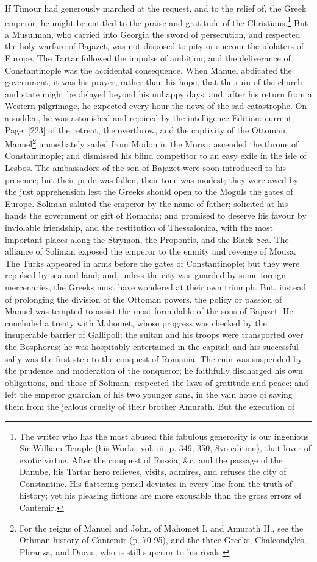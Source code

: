If Timour had generously marched at the request, and to the relief of, the Greek emperor, he might be entitled to the praise and gratitude of the Christians.\footnote{The writer who has the most abused this fabulous generosity is our ingenious Sir William Temple (his Works, vol. iii. p. 349, 350, 8vo edition), that lover of exotic virtue. After the conquest of Russia, \&c. and the passage of the Danube, his Tartar hero relieves, visits, admires, and refuses the city of Constantine. His flattering pencil deviates in every line from the truth of history; yet his pleasing fictions are more excusable than the gross errors of Cantemir.} But a Musulman, who carried into Georgia the sword of persecution, and respected the holy warfare of Bajazet, was not disposed to pity or succour the idolaters of Europe. The Tartar followed the impulse of ambition; and the deliverance of Constantinople was the accidental consequence. When Manuel abdicated the government, it was his prayer, rather than his hope, that the ruin of the church and state might be delayed beyond his unhappy days; and, after his return from a Western pilgrimage, he expected every hour the news of the sad catastrophe. On a sudden, he was astonished and rejoiced by the intelligence Edition: current; Page: [223] of the retreat, the overthrow, and the captivity of the Ottoman. Manuel\footnote{For the reigns of Manuel and John, of Mahomet I. and Amurath II., see the Othman history of Cantemir (p. 70-95), and the three Greeks, Chalcondyles, Phranza, and Ducas, who is still superior to his rivals.} immediately sailed from Modon in the Morea; ascended the throne of Constantinople; and dismissed his blind competitor to an easy exile in the isle of Lesbos. The ambassadors of the son of Bajazet were soon introduced to his presence; but their pride was fallen, their tone was modest; they were awed by the just apprehension lest the Greeks should open to the Moguls the gates of Europe. Soliman saluted the emperor by the name of father; solicited at his hands the government or gift of Romania; and promised to deserve his favour by inviolable friendship, and the restitution of Thessalonica, with the most important places along the Strymon, the Propontis, and the Black Sea. The alliance of Soliman exposed the emperor to the enmity and revenge of Mousa. The Turks appeared in arms before the gates of Constantinople; but they were repulsed by sea and land; and, unless the city was guarded by some foreign mercenaries, the Greeks must have wondered at their own triumph. But, instead of prolonging the division of the Ottoman powers, the policy or passion of Manuel was tempted to assist the most formidable of the sons of Bajazet. He concluded a treaty with Mahomet, whose progress was checked by the insuperable barrier of Gallipoli: the sultan and his troops were transported over the Bosphorus; he was hospitably entertained in the capital; and his successful sally was the first step to the conquest of Romania. The ruin was suspended by the prudence and moderation of the conqueror; he faithfully discharged his own obligations, and those of Soliman; respected the laws of gratitude and peace; and left the emperor guardian of his two younger sons, in the vain hope of saving them from the jealous cruelty of their brother Amurath. But the execution of 